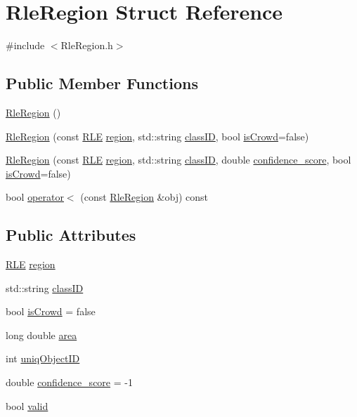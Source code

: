 \hypertarget{struct_rle_region}{}\section{Rle\+Region Struct Reference}
\label{struct_rle_region}


{\ttfamily \#include $<$Rle\+Region.\+h$>$}

\subsection*{Public Member Functions}
\begin{DoxyCompactItemize}
\item 
\hyperlink{struct_rle_region_ab063a41af1b0f347a8f7c795701e8df4}{Rle\+Region} ()
\item 
\hyperlink{struct_rle_region_a5a958f4acd2e0a722c1b957f334fd6a8}{Rle\+Region} (const \hyperlink{struct_r_l_e}{R\+LE} \hyperlink{struct_rle_region_a8ff53bb490cff0b34df4bd1708f78585}{region}, std\+::string \hyperlink{struct_rle_region_a780979dab8101846a642c62652bc6497}{class\+ID}, bool \hyperlink{struct_rle_region_a5786145e9bfdf49fc2a8234c3fa81bf5}{is\+Crowd}=false)
\item 
\hyperlink{struct_rle_region_a356a18c6c70b3ebd26dc653970d4e34a}{Rle\+Region} (const \hyperlink{struct_r_l_e}{R\+LE} \hyperlink{struct_rle_region_a8ff53bb490cff0b34df4bd1708f78585}{region}, std\+::string \hyperlink{struct_rle_region_a780979dab8101846a642c62652bc6497}{class\+ID}, double \hyperlink{struct_rle_region_a449164ed10ce2be4b79157048f3a01f1}{confidence\+\_\+score}, bool \hyperlink{struct_rle_region_a5786145e9bfdf49fc2a8234c3fa81bf5}{is\+Crowd}=false)
\item 
bool \hyperlink{struct_rle_region_af24e246b40408800d257b6b932086a97}{operator$<$} (const \hyperlink{struct_rle_region}{Rle\+Region} \&obj) const
\end{DoxyCompactItemize}
\subsection*{Public Attributes}
\begin{DoxyCompactItemize}
\item 
\hyperlink{struct_r_l_e}{R\+LE} \hyperlink{struct_rle_region_a8ff53bb490cff0b34df4bd1708f78585}{region}
\item 
std\+::string \hyperlink{struct_rle_region_a780979dab8101846a642c62652bc6497}{class\+ID}
\item 
bool \hyperlink{struct_rle_region_a5786145e9bfdf49fc2a8234c3fa81bf5}{is\+Crowd} = false
\item 
long double \hyperlink{struct_rle_region_a19f1b1dd0526f245690365dff403d984}{area}
\item 
int \hyperlink{struct_rle_region_a3e9536b27f34bb3932c5b3d3f60a416b}{uniq\+Object\+ID}
\item 
double \hyperlink{struct_rle_region_a449164ed10ce2be4b79157048f3a01f1}{confidence\+\_\+score} = -\/1
\item 
bool \hyperlink{struct_rle_region_aae3c2c209a051392c0ae50b9de5dc838}{valid}
\end{DoxyCompactItemize}


